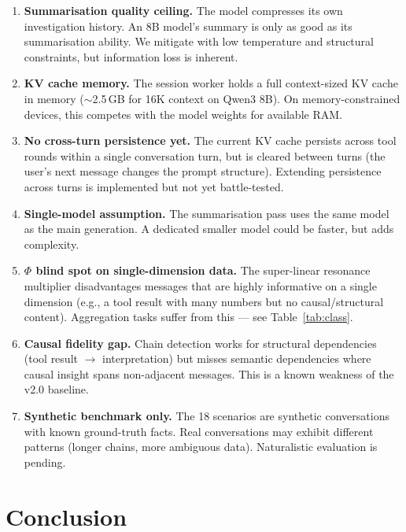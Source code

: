 \documentclass[11pt,a4paper]{article}
\begin{document}
\begin{enumerate}
  \item \textbf{Summarisation quality ceiling.} The model compresses its own investigation history. An 8B model's summary is only as good as its summarisation ability. We mitigate with low temperature and structural constraints, but information loss is inherent.

  \item \textbf{KV cache memory.} The session worker holds a full context-sized KV cache in memory ($\sim$2.5\,GB for 16K context on Qwen3 8B). On memory-constrained devices, this competes with the model weights for available RAM.

  \item \textbf{No cross-turn persistence yet.} The current KV cache persists across tool rounds within a single conversation turn, but is cleared between turns (the user's next message changes the prompt structure). Extending persistence across turns is implemented but not yet battle-tested.

  \item \textbf{Single-model assumption.} The summarisation pass uses the same model as the main generation. A dedicated smaller model could be faster, but adds complexity.

  \item \textbf{$\Phi$ blind spot on single-dimension data.} The super-linear resonance multiplier disadvantages messages that are highly informative on a single dimension (e.g., a tool result with many numbers but no causal/structural content). Aggregation tasks suffer from this --- see Table~\ref{tab:class}.

  \item \textbf{Causal fidelity gap.} Chain detection works for structural dependencies (tool result $\to$ interpretation) but misses semantic dependencies where causal insight spans non-adjacent messages. This is a known weakness of the v2.0 baseline.

  \item \textbf{Synthetic benchmark only.} The 18 scenarios are synthetic conversations with known ground-truth facts. Real conversations may exhibit different patterns (longer chains, more ambiguous data). Naturalistic evaluation is pending.
\end{enumerate}

\section{Conclusion}
\end{document}
